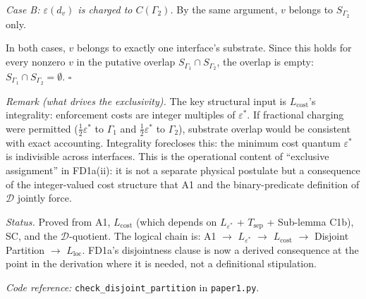 \documentclass[11pt]{article}
\theoremstyle{remark}
\newcommand{\coderef}[2]{\smallskip\noindent\textit{Code reference:} \texttt{#1} in \texttt{#2}.}
\begin{document}
\textit{Case B: $\varepsilon(d_v)$ is charged to $C(\Gamma_2)$.}  By the same argument, $v$ belongs to $S_{\Gamma_2}$ only.

In both cases, $v$ belongs to exactly one interface's substrate.  Since this holds for every nonzero $v$ in the putative overlap $S_{\Gamma_1} \cap S_{\Gamma_2}$, the overlap is empty: $S_{\Gamma_1} \cap S_{\Gamma_2} = \emptyset$.  \hfill$\square$

\smallskip\noindent\textit{Remark (what drives the exclusivity).}  The key structural input is $L_{\mathrm{cost}}$'s integrality: enforcement costs are integer multiples of $\varepsilon^*$.  If fractional charging were permitted ($\tfrac{1}{2}\varepsilon^*$ to $\Gamma_1$ and $\tfrac{1}{2}\varepsilon^*$ to $\Gamma_2$), substrate overlap would be consistent with exact accounting.  Integrality forecloses this: the minimum cost quantum $\varepsilon^*$ is indivisible across interfaces.  This is the operational content of ``exclusive assignment'' in FD1a(ii): it is not a separate physical postulate but a consequence of the integer-valued cost structure that A1 and the binary-predicate definition of $\mathcal{D}$ jointly force.

\smallskip\noindent\textit{Status.}  Proved from A1, $L_{\mathrm{cost}}$ (which depends on $L_{\varepsilon^*}$ + $T_{\mathrm{sep}}$ + Sub-lemma C1b), SC, and the $\mathcal{D}$-quotient.  The logical chain is: A1 $\to$ $L_{\varepsilon^*}$ $\to$ $L_{\mathrm{cost}}$ $\to$ Disjoint Partition $\to$ $L_{\mathrm{loc}}$.  FD1a's disjointness clause is now a derived consequence at the point in the derivation where it is needed, not a definitional stipulation.

\coderef{check\_disjoint\_partition}{paper1.py}
\end{document}

